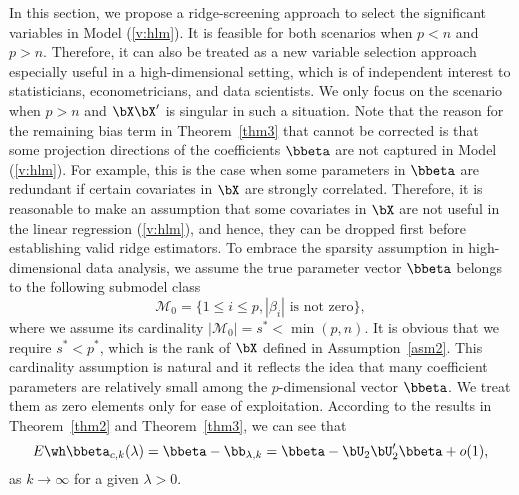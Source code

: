 In this section, we propose a ridge-screening approach to select the significant variables in Model (\ref{v:hlm}). It is feasible for both scenarios when $p<n$ and $p>n$. Therefore, it can also be treated as a new variable selection approach especially useful in a high-dimensional setting, which is of independent interest to statisticians, econometricians, and data scientists. We only focus on the scenario when $p>n$ and $\bX\bX'$ is singular in such a situation. Note that the reason for the remaining bias term in Theorem~\ref{thm3} that cannot be corrected is that some projection directions of the coefficients $\bbeta$ are not captured in Model (\ref{v:hlm}). For example, this is the case when some parameters in $\bbeta$ are redundant if certain covariates in $\bX$ are strongly correlated.  Therefore, it is reasonable to make an assumption that some covariates in $\bX$ are not useful in the linear regression (\ref{v:hlm}), and hence, they can be dropped first before establishing valid ridge estimators. To embrace the sparsity assumption in high-dimensional data analysis, we assume the true parameter vector $\bbeta$ belongs to the following submodel class
\begin{equation}\label{submodel}
    \mathcal{M}_0=\{1\leq i\leq p, |\beta_i|\,\,\text{is not zero}\},
\end{equation}
where we assume its cardinality $|\mathcal{M}_0|=s^*< \min(p,n)$. It is obvious that we require $s^*< p^*$, which is the rank of $\bX$ defined in Assumption~\ref{asm2}. This 
cardinality assumption is natural and it reflects the idea that many coefficient parameters are relatively small among the $p$-dimensional vector $\bbeta$. We treat them as zero elements only for ease of exploitation.  According to the results in Theorem~\ref{thm2} and Theorem~\ref{thm3}, we can see that
\begin{equation}\label{rd:decom}
    E\wh\bbeta_{c,k}(\lambda)=\bbeta-\bb_{\lambda,k}=\bbeta-\bU_2\bU_2'\bbeta+o(1),
\end{equation}
as $k\rightarrow\infty$ for a given $\lambda>0$. 



